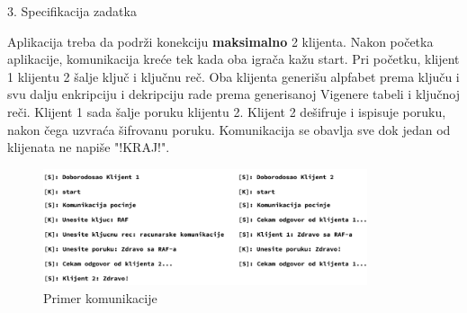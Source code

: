 \large{3. Specifikacija zadatka}
\normalsize

Aplikacija treba da podrži konekciju \textbf{maksimalno} 2 klijenta. Nakon početka aplikacije, komunikacija kreće tek kada oba igrača kažu start. Pri početku, klijent 1 klijentu 2 šalje ključ i ključnu reč. Oba klijenta generišu alpfabet prema ključu i svu dalju enkripciju i dekripciju rade prema generisanoj Vigenere tabeli i ključnoj reči. Klijent 1 sada šalje poruku klijentu 2. Klijent 2 dešifruje i ispisuje poruku, nakon čega uzvraća šifrovanu poruku. Komunikacija se obavlja sve dok jedan od klijenata ne napiše "!KRAJ!".

\begin{figure}[H]
    \centering
    \includegraphics[width=0.85\textwidth]{Slike/VTB/VTB_Primer_komunikacije.png}
    \caption*{Primer komunikacije}
    \label{fig:vtb_primer_komunikacije}
\end{figure}